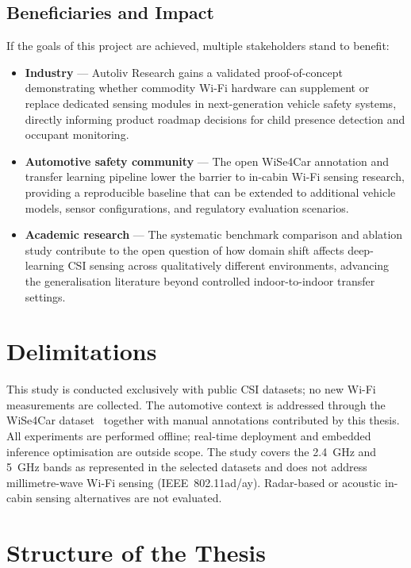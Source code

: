 \documentclass[english,bibtex]{kththesis}
\begin{document}
\subsection{Beneficiaries and Impact}
\label{sec:beneficiaries}

If the goals of this project are achieved, multiple stakeholders stand to benefit:

\begin{itemize}
  \item \textbf{Industry} --- Autoliv Research gains a validated proof-of-concept demonstrating whether commodity Wi-Fi hardware can supplement or replace dedicated sensing modules in next-generation vehicle safety systems, directly informing product roadmap decisions for child presence detection and occupant monitoring.

  \item \textbf{Automotive safety community} --- The open WiSe4Car annotation and transfer learning pipeline lower the barrier to in-cabin Wi-Fi sensing research, providing a reproducible baseline that can be extended to additional vehicle models, sensor configurations, and regulatory evaluation scenarios.

  \item \textbf{Academic research} --- The systematic benchmark comparison and ablation study contribute to the open question of how domain shift affects deep-learning CSI sensing across qualitatively different environments, advancing the generalisation literature beyond controlled indoor-to-indoor transfer settings.
\end{itemize}

\section{Delimitations}
\label{sec:delimitations}

This study is conducted exclusively with public CSI datasets; no new Wi-Fi measurements are collected. The automotive context is addressed through the WiSe4Car dataset~\cite{markert2025wise4car} together with manual annotations contributed by this thesis. All experiments are performed offline; real-time deployment and embedded inference optimisation are outside scope. The study covers the 2.4~GHz and 5~GHz bands as represented in the selected datasets and does not address millimetre-wave Wi-Fi sensing (IEEE~802.11ad/ay). Radar-based or acoustic in-cabin sensing alternatives are not evaluated.

\section{Structure of the Thesis}
\end{document}
